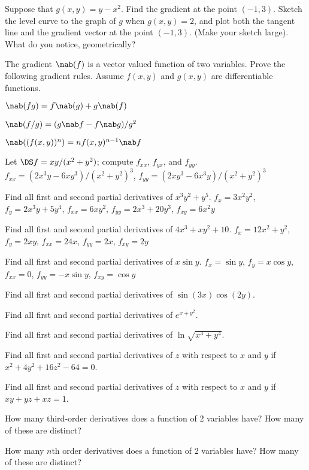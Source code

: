 \begin{multicols}{2}
\problem Suppose that $g(x,y)=y-x^2$.  Find the gradient at the point $(-1, %
3)$.  Sketch the level curve to the graph of $g$ when $g(x,y)=2$, and plot
both the tangent line and the gradient vector at the point $(-1,3)$. (Make
your sketch large).  What do you notice, geometrically?

\problem The gradient $\nab(f)$ is a vector valued function of two %
variables.  Prove the following gradient rules.  Assume $f(x,y)$ and
$g(x,y)$ are differentiable functions.

\subprob $\nab(fg)=f\nab(g)+g\nab(f)$

\subprob $\nab(f/g)=(g\nab f - f \nab g)/g^2$

\subprob $\nab((f(x,y))^n)=nf(x,y)^{n-1}\nab f$





\problem Let $\DS f=xy/(x^2+y^2)$; compute $f_{xx}$, $f_{yx}$, and %
$f_{yy}$.  \answer $f_{xx}=(2x^3y-6xy^3)/(x^2+y^2)^3$,
$f_{yy}=(2xy^3-6x^3y)/(x^2+y^2)^3$
\endanswer

\problem Find all first and second partial derivatives of $x^3y^2+y^5$. %
\answer $f_x=3x^2y^2$, $f_y=2x^3y+5y^4$, $f_{xx}=6xy^2$,
$f_{yy}=2x^3+20y^3$, $f_{xy}=6x^2y$
\endanswer

\problem Find all first and second partial derivatives of $4x^3+xy^2+10$. %
\answer $f_x=12x^2+y^2$, $f_y=2xy$, $f_{xx}=24x$, $f_{yy}=2x$, $f_{xy}=2y$
\endanswer

\problem Find all first and second partial derivatives of $x\sin y$. %
\answer $f_x=\sin y$, $f_y=x\cos y$, $f_{xx}=0$, $f_{yy}=-x\sin y$,
$f_{xy}=\cos y$
\endanswer

\problem Find all first and second partial derivatives of %
$\sin(3x)\cos(2y)$.

\problem Find all first and second partial derivatives of $e^{x+y^2}$. %

\problem Find all first and second partial derivatives of %
$\ln\sqrt{x^3+y^4}$.

\problem Find all first and second partial derivatives of $z$ with respect %
to $x$ and $y$ if $x^2+4y^2+16z^2-64=0$.

\problem Find all first and second partial derivatives of $z$ with respect %
to $x$ and $y$ if $xy+yz+xz=1$.

\problem How many third-order derivatives does a function of 2 variables %
have?  How many of these are distinct?

\problem How many $n$th order derivatives does a function of 2 variables %
have?  How many of these are distinct?


\end{multicols}

